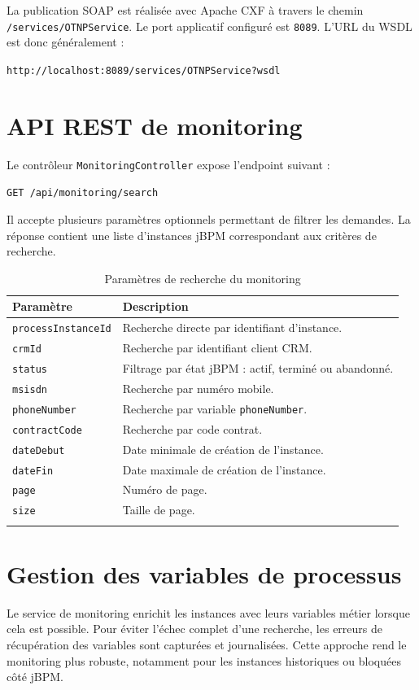 \documentclass[12pt,a4paper]{report}
\begin{document}
La publication SOAP est réalisée avec Apache CXF à travers le chemin \texttt{/services/OTNPService}. Le port applicatif configuré est \texttt{8089}. L'URL du WSDL est donc généralement :

\begin{center}
\texttt{http://localhost:8089/services/OTNPService?wsdl}
\end{center}

\section{API REST de monitoring}
Le contrôleur \texttt{MonitoringController} expose l'endpoint suivant :

\begin{center}
\texttt{GET /api/monitoring/search}
\end{center}

Il accepte plusieurs paramètres optionnels permettant de filtrer les demandes. La réponse contient une liste d'instances jBPM correspondant aux critères de recherche.

\begin{longtable}{p{4cm}p{9cm}}
    \toprule
    \textbf{Paramètre} & \textbf{Description} \\
    \midrule
    \endhead
    \texttt{processInstanceId} & Recherche directe par identifiant d'instance. \\
    \texttt{crmId} & Recherche par identifiant client CRM. \\
    \texttt{status} & Filtrage par état jBPM : actif, terminé ou abandonné. \\
    \texttt{msisdn} & Recherche par numéro mobile. \\
    \texttt{phoneNumber} & Recherche par variable \texttt{phoneNumber}. \\
    \texttt{contractCode} & Recherche par code contrat. \\
    \texttt{dateDebut} & Date minimale de création de l'instance. \\
    \texttt{dateFin} & Date maximale de création de l'instance. \\
    \texttt{page} & Numéro de page. \\
    \texttt{size} & Taille de page. \\
    \bottomrule
    \caption{Paramètres de recherche du monitoring}
\end{longtable}

\section{Gestion des variables de processus}
Le service de monitoring enrichit les instances avec leurs variables métier lorsque cela est possible. Pour éviter l'échec complet d'une recherche, les erreurs de récupération des variables sont capturées et journalisées. Cette approche rend le monitoring plus robuste, notamment pour les instances historiques ou bloquées côté jBPM.
\end{document}
